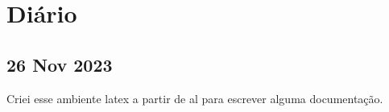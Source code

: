 \chapter{Diário}

\section{26 Nov 2023}

Criei esse ambiente latex a partir de al para escrever alguma documentação.